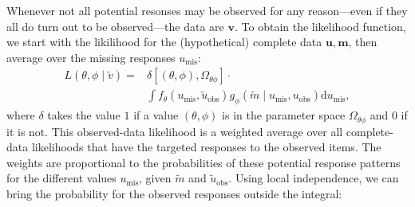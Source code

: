 \documentclass[
    a4paper,                %
    11pt,                   %
    jou,                    %
    biblatex                %
    colorlinks=true,        %
    linkcolor=red,          %
    anchorcolor=black,      %
    citecolor=blue,         %
    urlcolor=blue,          %
    bookmarks=true,         %
    bookmarksopen=false,    %
    bookmarksnumbered=true  %
]{apa7}
\newcommand{\dd}{\mathrm{d}}
\newcommand{\m}[1]{\boldsymbol{#1}}
\renewcommand{\tilde}[1]{\widetilde{#1}}
\begin{document}
Whenever not all potential resonses may be observed for any reason---even if they all do turn out to be observed---the data are $\m{v}$. To obtain the likelihood function, we start with the likilihood for the (hypothetical) complete data $\m{u}, \m{m}$, then average over the missing responses $u_\text{mis}$:
\begin{equation*}
    \begin{aligned}
    L\left( \theta, \phi  \mid  \tilde{v} \right) =
        &\delta \left[ (\theta, \phi), \Omega_{\theta\phi} \right]\cdot\\
        &\int f_\theta \left( u_\text{mis}, \tilde{u}_\text{obs} \right) g_\phi \left( \tilde{m}  \mid  u_\text{mis}, u_\text{obs}\right) \dd u_\text{mis},
    \end{aligned}
\end{equation*}
where $\delta$ takes the value $1$ if a value $(\theta,\phi)$ is in the parameter space $\Omega_{\theta\phi}$ and $0$ if it is not. This observed-data likelihood is a weighted average over all complete-data likelihoods that have the targeted responses to the observed items. The weights are proportional to the probabilities of these potential response patterns for the different values $u_\text{mis}$, given $\tilde{m}$ and $\tilde{u}_\text{obs}$. Using local independence, we can bring the probability for the observed responses outside the integral:











\printbibliography
\end{document}
